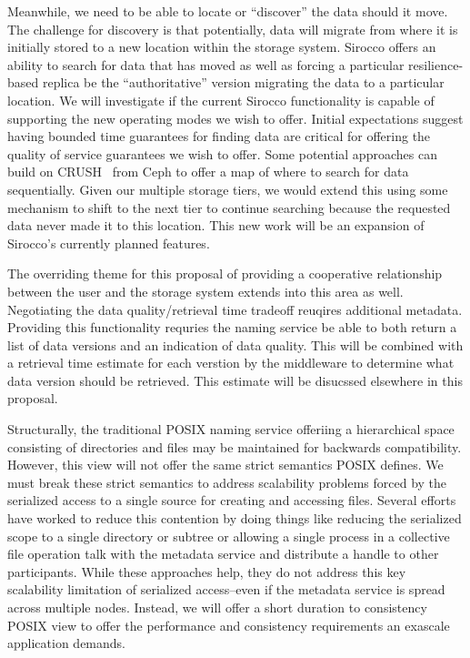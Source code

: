 Meanwhile, we need to be able to locate or ``discover'' the data should it
move.  The challenge for discovery is that potentially, data will migrate from
where it is initially stored to a new location within the storage system.
Sirocco offers an ability to search for data that has moved as well as forcing
a particular resilience-based replica be the ``authoritative'' version
migrating the data to a particular location. We will investigate if the current
Sirocco functionality is capable of supporting the new operating modes we wish
to offer. Initial expectations suggest having bounded time guarantees for
finding data are critical for offering the quality of service guarantees we
wish to offer. Some potential approaches can build on CRUSH~\cite{weil:ceph} from
Ceph to offer a map of where to search for data sequentially. Given our
multiple storage tiers, we would extend this using some mechanism to shift to
the next tier to continue searching because the requested data never made it to
this location. This new work will be an expansion of Sirocco's currently
planned features.

The overriding theme for this proposal of providing a cooperative relationship
between the user and the storage system extends into this area as well.
Negotiating the data quality/retrieval time tradeoff reuqires additional
metadata.  Providing this functionality requries the naming service be able to
both return a list of data versions and an indication of data quality. This
will be combined with a retrieval time estimate for each verstion by the
middleware to determine what data version should be retrieved.  This estimate
will be disucssed elsewhere in this proposal.

Structurally, the traditional POSIX naming service offeriing a hierarchical
space consisting of directories and files may be maintained for backwards
compatibility. However, this view will not offer the same strict semantics
POSIX defines. We must break these strict semantics to address scalability
problems forced by the serialized access to a single source for creating and
accessing files.  Several efforts~\cite{patil:2007:giga+,carns:pvfs} have worked to
reduce this contention by doing things like reducing the serialized scope to a
single directory or subtree or allowing a single process in a collective file
operation talk with the metadata service and distribute a handle to other
participants. While these approaches help, they do not address this key
scalability limitation of serialized access--even if the metadata service is
spread across multiple nodes. Instead, we will offer a short duration to
consistency POSIX view to offer the performance and consistency requirements an
exascale application demands.

